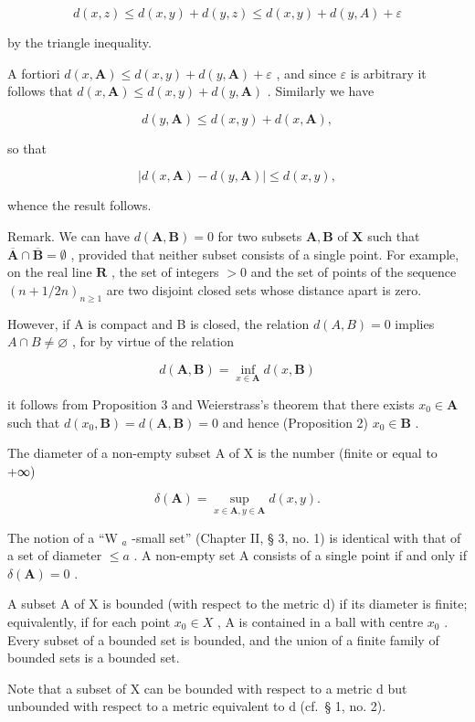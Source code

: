 \[
d (x, z) \leqslant d (x, y) + d (y, z) \leqslant d (x, y) + d (y, A) + \varepsilon
\]

by the triangle inequality.

A fortiori \(d(x, \mathbf{A}) \leqslant d(x, y) + d(y, \mathbf{A}) + \varepsilon\) , and since \(\varepsilon\) is arbitrary it follows that \(d(x, \mathbf{A}) \leqslant d(x, y) + d(y, \mathbf{A})\) . Similarly we have

\[
d (y, \mathbf {A}) \leqslant d (x, y) + d (x, \mathbf {A}),
\]

so that

\[
\left| d (x, \mathbf {A}) - d (y, \mathbf {A}) \right| \leqslant d (x, y),\tag{2}
\]

whence the result follows.

Remark. We can have \(d(\mathbf{A}, \mathbf{B}) = 0\) for two subsets \(\mathbf{A}, \mathbf{B}\) of \(\mathbf{X}\) such that \(\overline{\mathbf{A}} \cap \overline{\mathbf{B}} = \emptyset\) , provided that neither subset consists of a single point. For example, on the real line \(\mathbf{R}\) , the set of integers \(> 0\) and the set of points of the sequence \((n + 1/2n)_{n \geqslant 1}\) are two disjoint closed sets whose distance apart is zero.

However, if A is compact and B is closed, the relation \(d(A, B) = 0\) implies \(A \cap B \neq \varnothing\) , for by virtue of the relation

\[
d (\mathbf {A}, \mathbf {B}) = \inf _ {x \in \mathbf {A}} d (x, \mathbf {B})
\]

it follows from Proposition 3 and Weierstrass's theorem that there exists \(x_0 \in \mathbf{A}\) such that \(d(x_0, \mathbf{B}) = d(\mathbf{A}, \mathbf{B}) = 0\) and hence (Proposition 2) \(x_0 \in \mathbf{B}\) .

The diameter of a non-empty subset A of X is the number (finite or equal to +∞)

\[
\delta (\mathbf {A}) = \sup _ {x \in \mathbf {A}, y \in \mathbf {A}} d (x, y).
\]

The notion of a ``W \(_{a}\) -small set'' (Chapter II, § 3, no. 1) is identical with that of a set of diameter \(\leqslant a\) . A non-empty set A consists of a single point if and only if \(\delta(\mathbf{A}) = 0\) .

A subset A of X is bounded (with respect to the metric d) if its diameter is finite; equivalently, if for each point \(x_{0} \in X\) , A is contained in a ball with centre \(x_{0}\) . Every subset of a bounded set is bounded, and the union of a finite family of bounded sets is a bounded set.

Note that a subset of X can be bounded with respect to a metric d but unbounded with respect to a metric equivalent to d (cf.~§ 1, no. 2).

